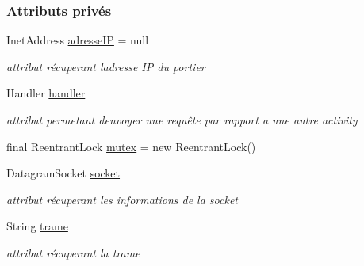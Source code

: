 \subsubsection*{Attributs privés}
\begin{DoxyCompactItemize}
\item 
Inet\+Address \hyperlink{classcom_1_1lasalle_1_1meeting_1_1_communication_a46e5fbc8ec97ad651d544e09121a6468}{adresse\+IP} = null
\begin{DoxyCompactList}\small\item\em attribut récuperant l\textquotesingle{}adresse IP du portier \end{DoxyCompactList}\item 
Handler \hyperlink{classcom_1_1lasalle_1_1meeting_1_1_communication_a05fa5f360f28819a9e106e0265a74643}{handler}
\begin{DoxyCompactList}\small\item\em attribut permetant d\textquotesingle{}envoyer une requête par rapport a une autre activity \end{DoxyCompactList}\item 
final Reentrant\+Lock \hyperlink{classcom_1_1lasalle_1_1meeting_1_1_communication_af123afba8dcddc259017fb5c3b431dab}{mutex} = new Reentrant\+Lock()
\item 
Datagram\+Socket \hyperlink{classcom_1_1lasalle_1_1meeting_1_1_communication_a2a538f36640aecebbb833bbaf1f03858}{socket}
\begin{DoxyCompactList}\small\item\em attribut récuperant les informations de la socket \end{DoxyCompactList}\item 
String \hyperlink{classcom_1_1lasalle_1_1meeting_1_1_communication_a1c5c3782ce80717dab95ed5335929333}{trame}
\begin{DoxyCompactList}\small\item\em attribut récuperant la trame \end{DoxyCompactList}\end{DoxyCompactItemize}
